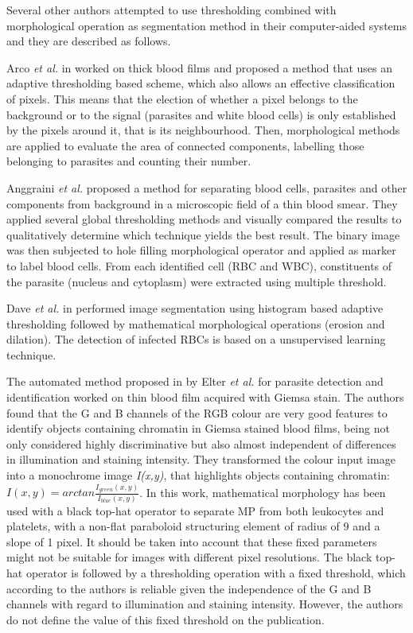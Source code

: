 \documentclass[sensors,review,submit,moreauthors,pdftex,10pt,a4paper]{mdpi}
\begin{document}
Several other authors attempted to use thresholding combined with morphological operation as segmentation method in their computer-aided systems and they are described as follows.

Arco \emph{et al.} in \cite{Arco2014} worked on thick blood films and proposed a method that uses an adaptive thresholding based scheme, which also allows an effective classification of pixels. This means that the election of whether a pixel belongs to the background or to the signal (parasites and white blood cells) is only established by the pixels around it, that is its neighbourhood. Then, morphological methods are applied to evaluate the area of connected components, labelling those belonging to parasites and counting their number.

Anggraini \emph{et al.} \cite{Anggraini2011} proposed a method for separating blood cells, parasites and other components from background in a microscopic field of a thin blood smear. They applied several global thresholding methods and visually compared the results to qualitatively determine which technique yields the best result. The binary image was then subjected to hole filling morphological operator and applied as marker to label blood cells. From each identified cell (RBC and WBC), constituents of the parasite (nucleus and cytoplasm) were extracted using multiple threshold.

Dave \emph{et al.} in \cite{Dave2017} performed image segmentation using histogram based adaptive thresholding followed by mathematical morphological operations (erosion and dilation). The detection of infected RBCs is based on a unsupervised learning technique.

The automated method proposed in \cite{Elter2011} by Elter \emph{et al.} for parasite detection and identification worked on thin blood film acquired with Giemsa stain. The authors found that the G and B channels of the RGB colour are very good features to identify objects containing chromatin in Giemsa stained blood films, being not only considered highly discriminative but also almost independent of differences in illumination and staining intensity. They transformed the colour input image into a monochrome image \textit{I(x,y)}, that highlights objects containing chromatin: $ I(x,y) = arctan \frac{I_{green}(x,y)}{I_{blue}(x,y)} $. In this work, mathematical morphology has been used with a black top-hat operator to separate MP from both leukocytes and platelets, with a non-flat paraboloid structuring element of radius of 9 and a slope of 1 pixel. It should be taken into account that these fixed parameters might not be suitable for images with different pixel resolutions. The black top-hat operator is followed by a thresholding operation with a fixed threshold, which according to the authors is reliable given the independence of the G and B channels with regard to illumination and staining intensity. However, the authors do not define the value of this fixed threshold on the publication.
\end{document}
